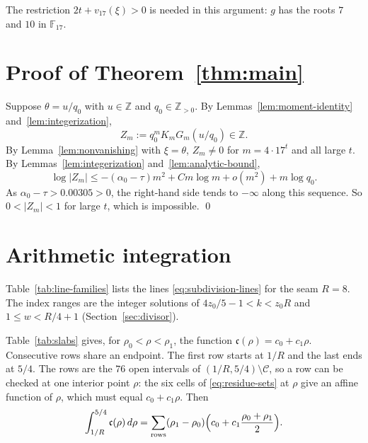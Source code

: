 \documentclass{amsart}
\numberwithin{equation}{section}
\numberwithin{table}{section}
\newcommand{\Z}{\mathbb{Z}}
\newcommand{\Rseam}{8}
\newcommand{\nslabs}{76}
\newcommand{\marginvalue}{0.00305}
\begin{document}
The restriction $2t+v_{17}(\xi)>0$ is needed in this argument: $g$ has the
roots $7$ and $10$ in $\mathbb F_{17}$.

\section{Proof of Theorem~\ref{thm:main}}\label{sec:proof}

Suppose $\theta=u/q_0$ with $u\in\Z$ and $q_0\in\Z_{>0}$. By
Lemmas~\ref{lem:moment-identity} and~\ref{lem:integerization},
\[
Z_m:=q_0^mK_mG_m(u/q_0)\in\Z.
\]
By Lemma~\ref{lem:nonvanishing} with $\xi=\theta$, $Z_m\ne0$ for
$m=4\cdot17^t$ and all large $t$.
By Lemmas~\ref{lem:integerization} and~\ref{lem:analytic-bound},
\begin{equation*}
\log|Z_m|\le-(\alpha_0-\tau)m^2+Cm\log m+o(m^2)+m\log q_0.
\end{equation*}
As $\alpha_0-\tau>\marginvalue>0$, the right-hand side tends to $-\infty$ along this
sequence. So $0<|Z_m|<1$ for large $t$, which is impossible.
\qed

\appendix

\section{Arithmetic integration}\label{app:arithmetic}
Table~\ref{tab:line-families} lists the lines \eqref{eq:subdivision-lines}
for the seam $R=\Rseam$. The index ranges are the integer solutions of
$4z_0/5-1<k<z_0R$ and $1\le w<R/4+1$ (Section~\ref{sec:divisor}).

Table~\ref{tab:slabs} gives, for $\rho_0<\rho<\rho_1$, the function
$\mathfrak c(\rho)=c_0+c_1\rho$. Consecutive rows share an endpoint. The
first row starts at $1/R$ and the last ends at $5/4$. The rows are the
$\nslabs$ open intervals of $(1/R,5/4)\setminus\mathcal C$, so a row can be
checked at one interior point $\rho$: the six cells of
\eqref{eq:residue-sets} at $\rho$ give an affine function of $\rho$, which
must equal $c_0+c_1\rho$. Then
\[
 \int_{1/R}^{5/4}\mathfrak c(\rho)\,d\rho
 =\sum_{\rm rows}(\rho_1-\rho_0)\Bigl(c_0+c_1\frac{\rho_0+\rho_1}2\Bigr).
\]
\end{document}
